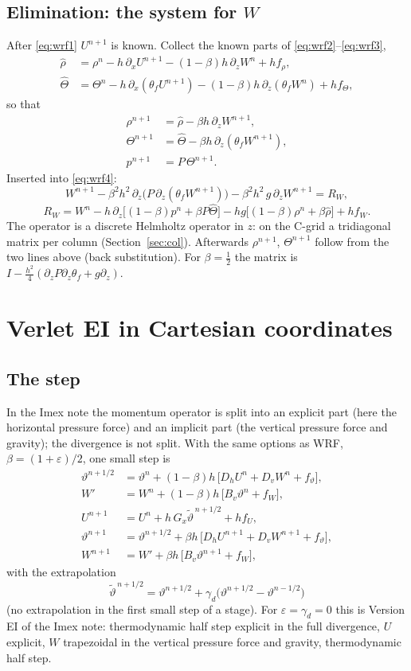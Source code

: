\documentclass[11pt,a4paper]{article}
\newcommand{\tv}{\vartheta}   %
\begin{document}
\subsection{Elimination: the system for $W$}
After \eqref{eq:wrf1} $U^{n+1}$ is known. Collect the known parts of \eqref{eq:wrf2}--\eqref{eq:wrf3},
\begin{align*}
\hat\rho&=\rho^n-h\,\partial_xU^{n+1}-(1-\beta)h\,\partial_zW^n+hf_\rho,\\
\hat\Theta&=\Theta^n-h\,\partial_x(\theta_fU^{n+1})-(1-\beta)h\,\partial_z(\theta_fW^n)+hf_\Theta,
\end{align*}
so that
\begin{align*}
\rho^{n+1}&=\hat\rho-\beta h\,\partial_zW^{n+1},\\
\Theta^{n+1}&=\hat\Theta-\beta h\,\partial_z(\theta_fW^{n+1}),\\
p^{n+1}&=P\,\Theta^{n+1} .
\end{align*}
Inserted into \eqref{eq:wrf4}:
\[
W^{n+1}-\beta^2h^2\,\partial_z\big(P\,\partial_z(\theta_fW^{n+1})\big)-\beta^2h^2\,g\,\partial_zW^{n+1}=R_W,
\]
\[
R_W=W^n-h\,\partial_z\big[(1-\beta)p^n+\beta P\hat\Theta\big]-hg\big[(1-\beta)\rho^n+\beta\hat\rho\big]+hf_W .
\]
The operator is a discrete Helmholtz operator in $z$: on the C-grid a tridiagonal matrix per column
(Section~\ref{sec:col}). Afterwards $\rho^{n+1}$, $\Theta^{n+1}$ follow from the two lines above (back substitution).
For $\beta=\tfrac12$ the matrix is $I-\tfrac{h^2}4(\partial_zP\partial_z\theta_f+g\partial_z)$.

\section{Verlet EI in Cartesian coordinates}\label{sec:ei}
\subsection{The step}
In the Imex note the momentum operator is split into an explicit part (here the horizontal pressure
force) and an implicit part (the vertical pressure force and gravity); the divergence is not split.
With the same options as WRF, $\beta=(1+\varepsilon)/2$, one small step is
\begin{align}
\tv^{n+1/2}&=\tv^n+(1-\beta)h\,\big[D_hU^n+D_vW^n+f_\tv\big],\label{eq:ei1}\\
W'&=W^n+(1-\beta)h\,\big[B_v\tv^n+f_W\big],\label{eq:ei1w}\\
U^{n+1}&=U^n+h\,G_x\tilde\tv^{\,n+1/2}+hf_U,\label{eq:ei2}\\
\tv^{n+1}&=\tv^{n+1/2}+\beta h\,\big[D_hU^{n+1}+D_vW^{n+1}+f_\tv\big],\label{eq:ei3}\\
W^{n+1}&=W'+\beta h\,\big[B_v\tv^{n+1}+f_W\big],\label{eq:ei4}
\end{align}
with the extrapolation
\[
\tilde\tv^{\,n+1/2}=\tv^{n+1/2}+\gamma_d\big(\tv^{n+1/2}-\tv^{n-1/2}\big)
\]
(no extrapolation in the first small step of a stage). For $\varepsilon=\gamma_d=0$ this is Version EI of the Imex
note: thermodynamic half step explicit in the full divergence, $U$ explicit, $W$ trapezoidal in the
vertical pressure force and gravity, thermodynamic half step.
\end{document}
